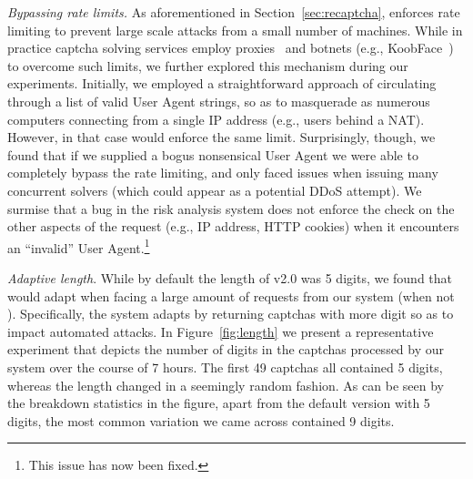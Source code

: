 \emph{Bypassing rate limits.} As aforementioned in Section~\ref{sec:recaptcha}, \re enforces 
rate limiting to prevent large scale attacks from a small number of machines. While in practice
captcha solving services employ proxies~\cite{captcha_proxies} and botnets (e.g., KoobFace~\cite{captcha_solvers}) 
to overcome such limits, we further explored this mechanism during our experiments. Initially,
we employed a straightforward approach of circulating through a list of valid User Agent strings,
so as to masquerade as numerous computers connecting from a single IP address (e.g., users behind a NAT).
However, in that case \re would enforce the same limit. Surprisingly, though, we found that if we 
supplied a bogus nonsensical User Agent we were able to completely bypass the rate limiting,
and only faced issues when issuing many concurrent solvers (which could appear as a potential DDoS attempt).
We surmise that a bug in the risk analysis
system does not enforce the check on the other aspects of the request (e.g., IP address, HTTP cookies) when
it encounters an ``invalid'' User Agent.\footnote{This issue has now been fixed.}

\emph{Adaptive length}.
While by default the length of \re v2.0 was 5 digits, we found %
that \re would adapt when facing a large amount of requests from our system (when not ).
Specifically, the system adapts by returning captchas with more digit so as to impact automated attacks.
In Figure~\ref{fig:length} we present a representative experiment that depicts the number of digits in the captchas
processed by our system over the course of 7 hours. The first 49 captchas all contained 5 digits, whereas the length
changed in a seemingly random fashion. As can be seen by the breakdown statistics in the figure, apart from the default
version with 5 digits, the most common variation we came across contained 9 digits. 

